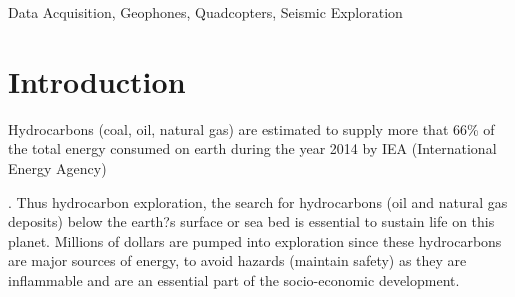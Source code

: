 \documentclass[conference]{IEEEtran}
\newcommand{\todo}[1]{\vspace{5 mm}\par \noindent \framebox{\begin{minipage}[c]{0.98 \columnwidth} \ttfamily\flushleft \textcolor{red}{#1}\end{minipage}}\vspace{5 mm}\par}
\begin{document}
\begin{abstract}
 
\end{abstract}
\begin{IEEEkeywords} Data Acquisition, Geophones, Quadcopters, Seismic Exploration \end{IEEEkeywords}




\section{Introduction}

\todo{insert an image of your quadcopter}

Hydrocarbons (coal, oil, natural gas) are estimated to supply more that 66\% of the total energy consumed on earth during the year 2014 by IEA (International Energy Agency)\todo{add this to references}.  Thus hydrocarbon exploration, the search for hydrocarbons (oil and natural gas deposits) below the earth?s surface or sea bed is essential to sustain life on this planet. Millions of dollars are pumped into exploration since these hydrocarbons are major sources of energy, to avoid hazards (maintain safety) as they are inflammable and are an essential part of the socio-economic development.
 
\end{document}
